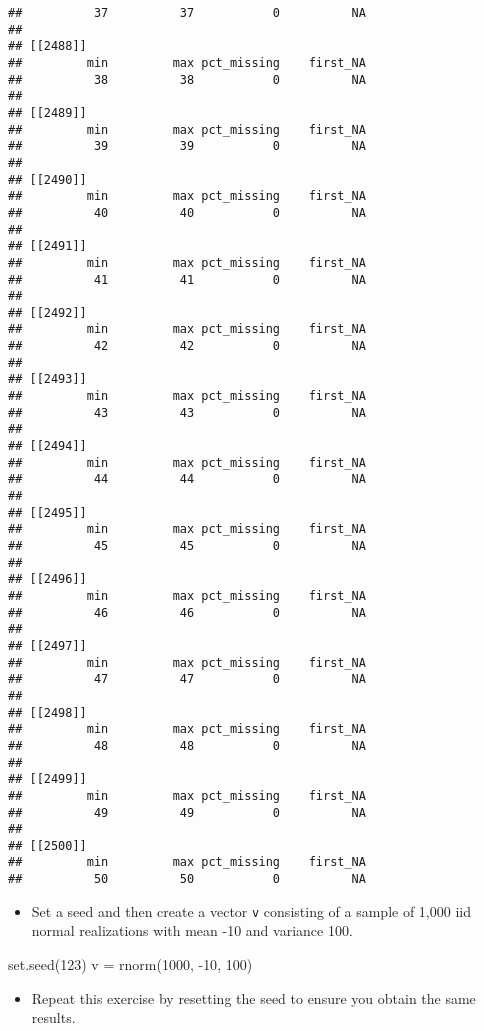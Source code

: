\documentclass[
]{article}
\newenvironment{Shaded}{\begin{snugshade}}{\end{snugshade}}
\newcommand{\DecValTok}[1]{\textcolor[rgb]{0.00,0.00,0.81}{#1}}
\newcommand{\FunctionTok}[1]{\textcolor[rgb]{0.00,0.00,0.00}{#1}}
\newcommand{\NormalTok}[1]{#1}
\newcommand{\OtherTok}[1]{\textcolor[rgb]{0.56,0.35,0.01}{#1}}
\newcommand{\SpecialCharTok}[1]{\textcolor[rgb]{0.00,0.00,0.00}{#1}}
\providecommand{\tightlist}{%
  \setlength{\itemsep}{0pt}\setlength{\parskip}{0pt}}
\begin{document}
\begin{verbatim}
##          37          37           0          NA 
## 
## [[2488]]
##         min         max pct_missing    first_NA 
##          38          38           0          NA 
## 
## [[2489]]
##         min         max pct_missing    first_NA 
##          39          39           0          NA 
## 
## [[2490]]
##         min         max pct_missing    first_NA 
##          40          40           0          NA 
## 
## [[2491]]
##         min         max pct_missing    first_NA 
##          41          41           0          NA 
## 
## [[2492]]
##         min         max pct_missing    first_NA 
##          42          42           0          NA 
## 
## [[2493]]
##         min         max pct_missing    first_NA 
##          43          43           0          NA 
## 
## [[2494]]
##         min         max pct_missing    first_NA 
##          44          44           0          NA 
## 
## [[2495]]
##         min         max pct_missing    first_NA 
##          45          45           0          NA 
## 
## [[2496]]
##         min         max pct_missing    first_NA 
##          46          46           0          NA 
## 
## [[2497]]
##         min         max pct_missing    first_NA 
##          47          47           0          NA 
## 
## [[2498]]
##         min         max pct_missing    first_NA 
##          48          48           0          NA 
## 
## [[2499]]
##         min         max pct_missing    first_NA 
##          49          49           0          NA 
## 
## [[2500]]
##         min         max pct_missing    first_NA 
##          50          50           0          NA
\end{verbatim}

\begin{itemize}
\tightlist
\item
  Set a seed and then create a vector \texttt{v} consisting of a sample
  of 1,000 iid normal realizations with mean -10 and variance 100.
\end{itemize}

\begin{Shaded}
\begin{Highlighting}[]
\FunctionTok{set.seed}\NormalTok{(}\DecValTok{123}\NormalTok{)}
\NormalTok{v }\OtherTok{=} \FunctionTok{rnorm}\NormalTok{(}\DecValTok{1000}\NormalTok{, }\SpecialCharTok{{-}}\DecValTok{10}\NormalTok{, }\DecValTok{100}\NormalTok{)}
\end{Highlighting}
\end{Shaded}

\begin{itemize}
\tightlist
\item
  Repeat this exercise by resetting the seed to ensure you obtain the
  same results.
\end{itemize}
\end{document}
